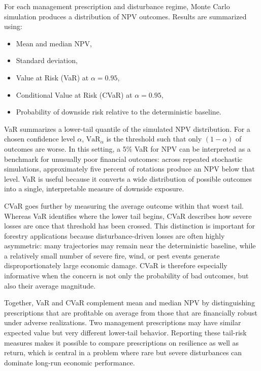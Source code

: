 \documentclass[12pt]{report}
\begin{document}
For each management prescription and disturbance regime, Monte Carlo simulation produces a distribution of NPV outcomes. Results are summarized using:

\begin{itemize}
    \item Mean and median NPV,
    \item Standard deviation,
    \item Value at Risk (VaR) at $\alpha = 0.95$,
    \item Conditional Value at Risk (CVaR) at $\alpha = 0.95$,
    \item Probability of downside risk relative to the deterministic baseline.
\end{itemize}

VaR summarizes a lower-tail quantile of the simulated NPV distribution. For a chosen confidence level $\alpha$, $\mathrm{VaR}_{\alpha}$ is the threshold such that only $(1-\alpha)$ of outcomes are worse. In this setting, a 5\% VaR for NPV can be interpreted as a benchmark for unusually poor financial outcomes: across repeated stochastic simulations, approximately five percent of rotations produce an NPV below that level. VaR is useful because it converts a wide distribution of possible outcomes into a single, interpretable measure of downside exposure.

CVaR goes further by measuring the average outcome within that worst tail. Whereas VaR identifies where the lower tail begins, CVaR describes how severe losses are once that threshold has been crossed. This distinction is important for forestry applications because disturbance-driven losses are often highly asymmetric: many trajectories may remain near the deterministic baseline, while a relatively small number of severe fire, wind, or pest events generate disproportionately large economic damage. CVaR is therefore especially informative when the concern is not only the probability of bad outcomes, but also their average magnitude.

Together, VaR and CVaR complement mean and median NPV by distinguishing prescriptions that are profitable on average from those that are financially robust under adverse realizations. Two management prescriptions may have similar expected value but very different lower-tail behavior. Reporting these tail-risk measures makes it possible to compare prescriptions on resilience as well as return, which is central in a problem where rare but severe disturbances can dominate long-run economic performance.
\end{document}
